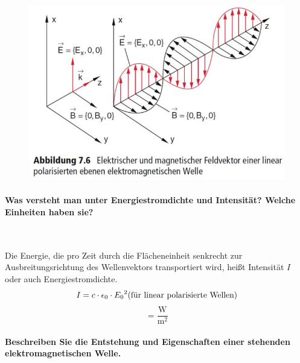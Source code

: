 \documentclass[a4paper, 11pt, parskip=half]{scrartcl}
\begin{document}
\begin{figure}[H]
    \centering
    \includegraphics[width=10 cm]{image/13/4.png}
\end{figure}

\paragraph{Was versteht man unter Energiestromdichte und Intensität? Welche Einheiten haben sie?} ~

Die Energie, die pro Zeit durch die Flächeneinheit senkrecht zur Ausbreitungsrichtung des
Wellenvektors transportiert wird, heißt Intensität $I$ oder auch Energiestromdichte.
\begin{equation}
I = c \cdot \epsilon_0 \cdot {E_0}^2 \text{(für linear polarisierte Wellen)} \\
\end{equation}
\begin{equation}
[I] = \frac{\text{W}}{\text{m}^2}
\end{equation}

\newpage

\paragraph{Beschreiben Sie die Entstehung und Eigenschaften einer stehenden elektromagnetischen
Welle.} ~
\end{document}
